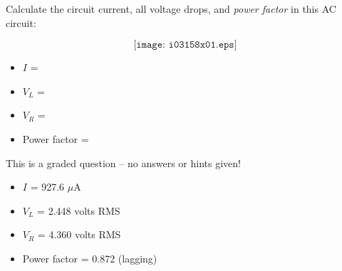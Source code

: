 

Calculate the circuit current, all voltage drops, and {\it power factor} in this AC circuit:

$$\texttt{[image: i03158x01.eps]}$$

\begin{itemize}
\item{} $I$ = 
\vskip 10pt
\item{} $V_L$ = 
\vskip 10pt
\item{} $V_R$ = 
\vskip 10pt
\item{} Power factor = 
\end{itemize}

\vfil 

\eject






This is a graded question -- no answers or hints given!
 






\begin{itemize}
\item{} $I$ = 927.6 $\mu$A
\vskip 5pt
\item{} $V_L$ = 2.448 volts RMS
\vskip 5pt
\item{} $V_R$ = 4.360 volts RMS
\vskip 5pt
\item{} Power factor = 0.872 (lagging)
\end{itemize}




